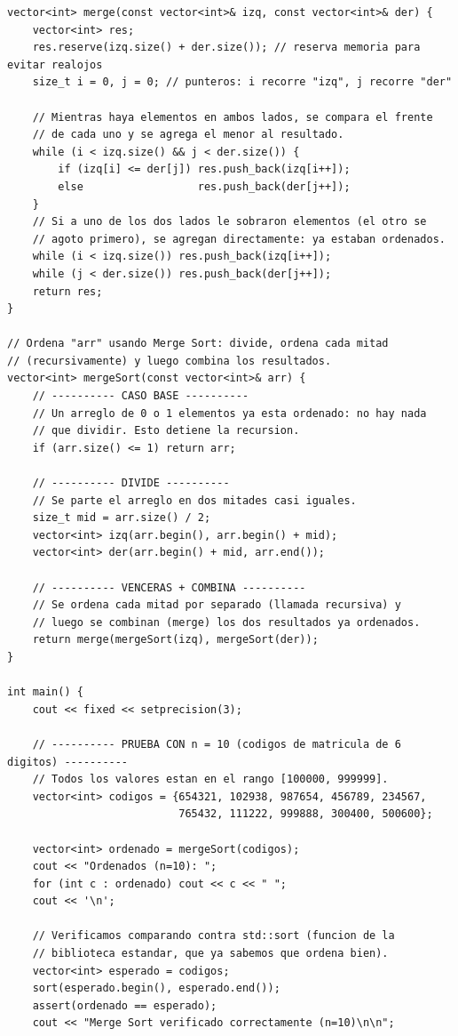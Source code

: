 \documentclass[12pt,a4paper]{article}
\begin{document}
\begin{lstlisting}[style=cpp]
vector<int> merge(const vector<int>& izq, const vector<int>& der) {
    vector<int> res;
    res.reserve(izq.size() + der.size()); // reserva memoria para evitar realojos
    size_t i = 0, j = 0; // punteros: i recorre "izq", j recorre "der"

    // Mientras haya elementos en ambos lados, se compara el frente
    // de cada uno y se agrega el menor al resultado.
    while (i < izq.size() && j < der.size()) {
        if (izq[i] <= der[j]) res.push_back(izq[i++]);
        else                  res.push_back(der[j++]);
    }
    // Si a uno de los dos lados le sobraron elementos (el otro se
    // agoto primero), se agregan directamente: ya estaban ordenados.
    while (i < izq.size()) res.push_back(izq[i++]);
    while (j < der.size()) res.push_back(der[j++]);
    return res;
}

// Ordena "arr" usando Merge Sort: divide, ordena cada mitad
// (recursivamente) y luego combina los resultados.
vector<int> mergeSort(const vector<int>& arr) {
    // ---------- CASO BASE ----------
    // Un arreglo de 0 o 1 elementos ya esta ordenado: no hay nada
    // que dividir. Esto detiene la recursion.
    if (arr.size() <= 1) return arr;

    // ---------- DIVIDE ----------
    // Se parte el arreglo en dos mitades casi iguales.
    size_t mid = arr.size() / 2;
    vector<int> izq(arr.begin(), arr.begin() + mid);
    vector<int> der(arr.begin() + mid, arr.end());

    // ---------- VENCERAS + COMBINA ----------
    // Se ordena cada mitad por separado (llamada recursiva) y
    // luego se combinan (merge) los dos resultados ya ordenados.
    return merge(mergeSort(izq), mergeSort(der));
}

int main() {
    cout << fixed << setprecision(3);

    // ---------- PRUEBA CON n = 10 (codigos de matricula de 6 digitos) ----------
    // Todos los valores estan en el rango [100000, 999999].
    vector<int> codigos = {654321, 102938, 987654, 456789, 234567,
                           765432, 111222, 999888, 300400, 500600};

    vector<int> ordenado = mergeSort(codigos);
    cout << "Ordenados (n=10): ";
    for (int c : ordenado) cout << c << " ";
    cout << '\n';

    // Verificamos comparando contra std::sort (funcion de la
    // biblioteca estandar, que ya sabemos que ordena bien).
    vector<int> esperado = codigos;
    sort(esperado.begin(), esperado.end());
    assert(ordenado == esperado);
    cout << "Merge Sort verificado correctamente (n=10)\n\n";


\end{lstlisting}
\end{document}
